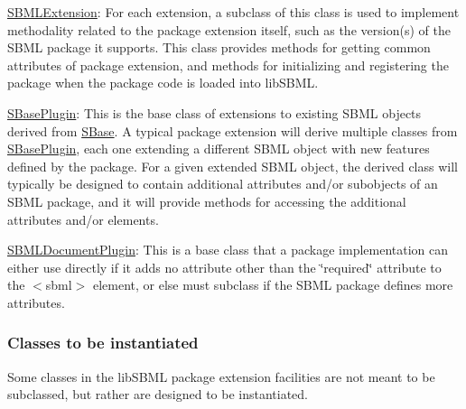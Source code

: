 \begin{DoxyItemize}
\item \hyperlink{class_s_b_m_l_extension}{S\+B\+M\+L\+Extension}\+: For each extension, a subclass of this class is used to implement methodality related to the package extension itself, such as the version(s) of the S\+B\+ML package it supports. This class provides methods for getting common attributes of package extension, and methods for initializing and registering the package when the package code is loaded into lib\+S\+B\+ML.\end{DoxyItemize}
\begin{DoxyItemize}
\item \hyperlink{class_s_base_plugin}{S\+Base\+Plugin}\+: This is the base class of extensions to existing S\+B\+ML objects derived from \hyperlink{class_s_base}{S\+Base}. A typical package extension will derive multiple classes from \hyperlink{class_s_base_plugin}{S\+Base\+Plugin}, each one extending a different S\+B\+ML object with new features defined by the package. For a given extended S\+B\+ML object, the derived class will typically be designed to contain additional attributes and/or subobjects of an S\+B\+ML package, and it will provide methods for accessing the additional attributes and/or elements.\end{DoxyItemize}
\begin{DoxyItemize}
\item \hyperlink{class_s_b_m_l_document_plugin}{S\+B\+M\+L\+Document\+Plugin}\+: This is a base class that a package implementation can either use directly if it adds no attribute other than the \char`\"{}required\char`\"{} attribute to the {\ttfamily $<$sbml$>$} element, or else must subclass if the S\+B\+ML package defines more attributes.\end{DoxyItemize}
\hypertarget{classdoc__summary__of__extension__classes_ext-to-be-instantiated}{}\subsubsection{Classes to be instantiated}\label{classdoc__summary__of__extension__classes_ext-to-be-instantiated}
Some classes in the lib\+S\+B\+ML package extension facilities are not meant to be subclassed, but rather are designed to be instantiated.

